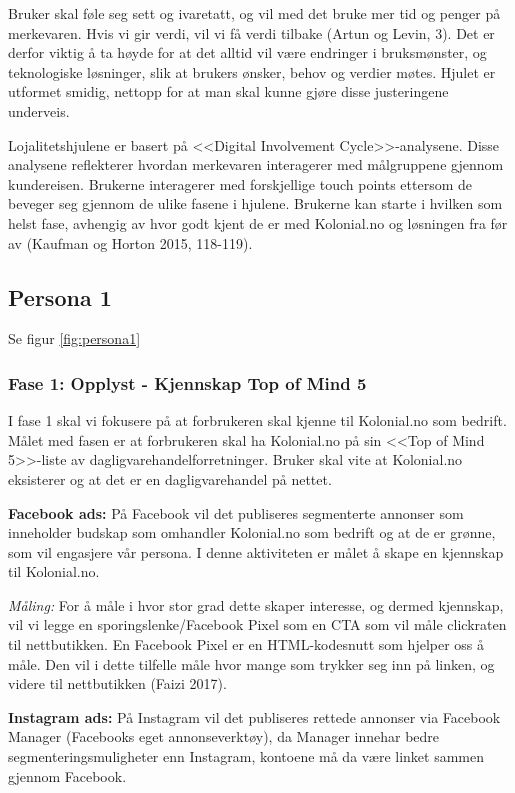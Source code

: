 Bruker skal føle seg sett og ivaretatt, og vil med det bruke mer tid og penger på merkevaren. Hvis vi gir verdi, vil vi få verdi tilbake (Artun og Levin, 3). Det er derfor viktig å ta høyde for at det alltid vil være endringer i bruksmønster, og teknologiske løsninger, slik at brukers ønsker, behov og verdier møtes. Hjulet er utformet smidig, nettopp for at man skal kunne gjøre disse justeringene underveis.

Lojalitetshjulene er basert på <<Digital Involvement Cycle>>-analysene. Disse analysene reflekterer hvordan merkevaren interagerer med målgruppene gjennom kundereisen. Brukerne interagerer med forskjellige touch points ettersom de beveger seg gjennom de ulike fasene i hjulene. Brukerne kan starte i hvilken som helst fase, avhengig av hvor godt kjent de er med Kolonial.no og løsningen fra før av (Kaufman og Horton 2015, 118-119).



\subsection{\textbf{Persona 1}}
\label{sec:persona1}
Se figur \ref{fig:persona1}

\subsubsection{\textbf{Fase 1: Opplyst - Kjennskap Top of Mind 5}}
I fase 1 skal vi fokusere på at forbrukeren skal kjenne til Kolonial.no som bedrift. Målet med fasen er at forbrukeren skal ha Kolonial.no på sin <<Top of Mind 5>>-liste av dagligvarehandelforretninger. Bruker skal vite at Kolonial.no eksisterer og at det er en dagligvarehandel på nettet.

\textbf{Facebook ads:} På Facebook vil det publiseres segmenterte annonser som inneholder budskap som omhandler Kolonial.no som bedrift og at de er grønne, som vil engasjere vår persona. I denne aktiviteten er målet  å skape en kjennskap til Kolonial.no. 

\textit{Måling:} For å måle i hvor stor grad dette skaper interesse, og dermed kjennskap, vil vi legge en sporingslenke/Facebook Pixel som en CTA som vil måle clickraten til nettbutikken. En Facebook Pixel er en HTML-kodesnutt som hjelper oss å måle. Den vil i dette tilfelle måle hvor mange som trykker seg inn på linken, og videre til nettbutikken (Faizi 2017). 

\textbf{Instagram ads:} På Instagram vil det publiseres rettede annonser via Facebook Manager (Facebooks eget annonseverktøy), da Manager innehar bedre segmenteringsmuligheter enn Instagram, kontoene må da være linket sammen gjennom Facebook. 

